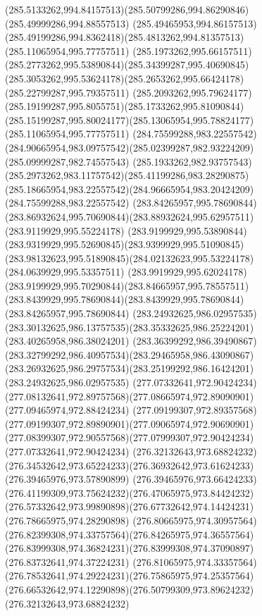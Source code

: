 {{		\curveto(285.5133262,994.84157513)(285.50799286,994.86290846)(285.49999286,994.88557513)
		\curveto(285.49465953,994.86157513)(285.49199286,994.8362418)(285.4813262,994.81357513)
		\moveto(285.11065954,995.77757511)
		\curveto(285.1973262,995.66157511)(285.2773262,995.53890844)(285.34399287,995.40690845)
		\curveto(285.3053262,995.53624178)(285.2653262,995.66424178)(285.22799287,995.79357511)
		\curveto(285.2093262,995.79624177)(285.19199287,995.8055751)(285.1733262,995.81090844)
		\curveto(285.15199287,995.80024177)(285.13065954,995.78824177)(285.11065954,995.77757511)
		\moveto(284.75599288,983.22557542)
		\curveto(284.90665954,983.09757542)(285.02399287,982.93224209)(285.09999287,982.74557543)
		\curveto(285.1933262,982.93757543)(285.2973262,983.11757542)(285.41199286,983.28290875)
		\curveto(285.18665954,983.22557542)(284.96665954,983.20424209)(284.75599288,983.22557542)
		\moveto(283.84265957,995.78690844)
		\curveto(283.86932624,995.70690844)(283.88932624,995.62957511)(283.9119929,995.55224178)
		\curveto(283.9199929,995.53890844)(283.9319929,995.52690845)(283.9399929,995.51090845)
		\curveto(283.98132623,995.51890845)(284.02132623,995.53224178)(284.0639929,995.53357511)
		\curveto(283.9919929,995.62024178)(283.9199929,995.70290844)(283.84665957,995.78557511)
		\curveto(283.8439929,995.78690844)(283.8439929,995.78690844)(283.84265957,995.78690844)
		\moveto(283.24932625,986.02957535)
		\curveto(283.30132625,986.13757535)(283.35332625,986.25224201)(283.40265958,986.38024201)
		\curveto(283.36399292,986.39490867)(283.32799292,986.40957534)(283.29465958,986.43090867)
		\curveto(283.26932625,986.29757534)(283.25199292,986.16424201)(283.24932625,986.02957535)
		\moveto(277.07332641,972.90424234)
		\curveto(277.08132641,972.89757568)(277.08665974,972.89090901)(277.09465974,972.88424234)
		\curveto(277.09199307,972.89357568)(277.09199307,972.89890901)(277.09065974,972.90690901)
		\curveto(277.08399307,972.90557568)(277.07999307,972.90424234)(277.07332641,972.90424234)
		\moveto(276.32132643,973.68824232)
		\curveto(276.34532642,973.65224233)(276.36932642,973.61624233)(276.39465976,973.57890899)
		\curveto(276.39465976,973.66424233)(276.41199309,973.75624232)(276.47065975,973.84424232)
		\curveto(276.57332642,973.99890898)(276.67732642,974.14424231)(276.78665975,974.28290898)
		\curveto(276.80665975,974.30957564)(276.82399308,974.33757564)(276.84265975,974.36557564)
		\curveto(276.83999308,974.36824231)(276.83999308,974.37090897)(276.83732641,974.37224231)
		\curveto(276.81065975,974.33357564)(276.78532641,974.29224231)(276.75865975,974.25357564)
		\curveto(276.66532642,974.12290898)(276.50799309,973.89624232)(276.32132643,973.68824232)
}}
